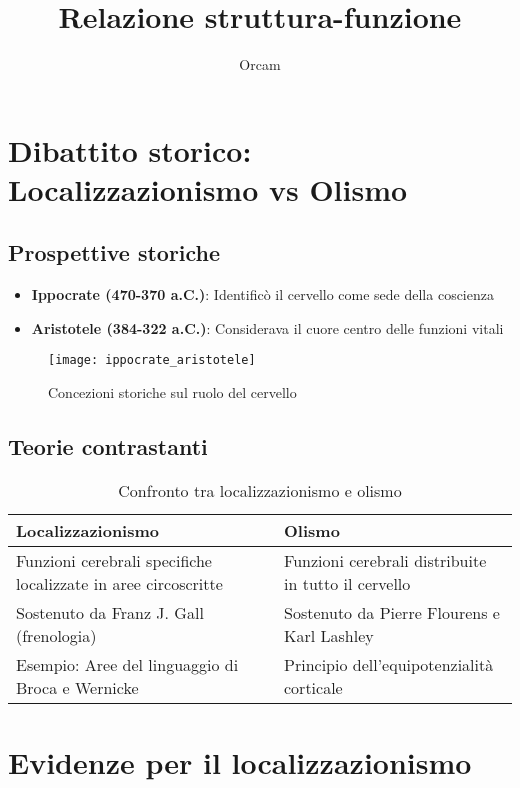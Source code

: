 \documentclass[11pt]{article}
\title{Relazione struttura-funzione}
\author{Orcam}
\date{}
\begin{document}
\maketitle

\section*{Dibattito storico: Localizzazionismo vs Olismo}

\subsection*{Prospettive storiche}
\begin{itemize}
    \item \textbf{Ippocrate (470-370 a.C.)}: Identificò il cervello come sede della coscienza
    \item \textbf{Aristotele (384-322 a.C.)}: Considerava il cuore centro delle funzioni vitali
\end{itemize}

\begin{figure}[h]
    \centering
    \texttt{[image: ippocrate\_aristotele]} %
    \caption{Concezioni storiche sul ruolo del cervello}
    \label{fig:storico}
\end{figure}

\subsection*{Teorie contrastanti}
\begin{table}[h]
\centering
\caption{Confronto tra localizzazionismo e olismo}
\begin{tabular}{p{7cm}p{7cm}}
\toprule
\textbf{Localizzazionismo} & \textbf{Olismo} \\
\midrule
Funzioni cerebrali specifiche localizzate in aree circoscritte & Funzioni cerebrali distribuite in tutto il cervello \\
Sostenuto da Franz J. Gall (frenologia) & Sostenuto da Pierre Flourens e Karl Lashley \\
Esempio: Aree del linguaggio di Broca e Wernicke & Principio dell'equipotenzialità corticale \\
\bottomrule
\end{tabular}
\end{table}

\section*{Evidenze per il localizzazionismo}
\end{document}

